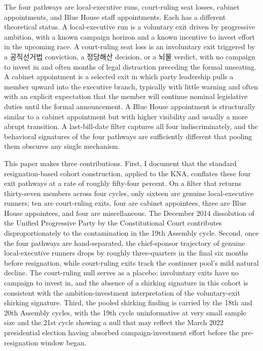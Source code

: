 \documentclass[11pt]{article}
\begin{document}
The four pathways are local-executive runs, court-ruling seat losses, cabinet appointments, and Blue House staff appointments. Each has a different theoretical status. A local-executive run is a voluntary exit driven by progressive ambition, with a known campaign horizon and a known incentive to invest effort in the upcoming race. A court-ruling seat loss is an involuntary exit triggered by a 공직선거법 conviction, a 정당해산 decision, or a 뇌물 verdict, with no campaign to invest in and often months of legal distraction preceding the formal unseating. A cabinet appointment is a selected exit in which party leadership pulls a member upward into the executive branch, typically with little warning and often with an explicit expectation that the member will continue nominal legislative duties until the formal announcement. A Blue House appointment is structurally similar to a cabinet appointment but with higher visibility and usually a more abrupt transition. A last-bill-date filter captures all four indiscriminately, and the behavioral signatures of the four pathways are sufficiently different that pooling them obscures any single mechanism.

This paper makes three contributions. First, I document that the standard resignation-based cohort construction, applied to the KNA, conflates these four exit pathways at a rate of roughly fifty-four percent. On a filter that returns thirty-seven members across four cycles, only sixteen are genuine local-executive runners; ten are court-ruling exits, four are cabinet appointees, three are Blue House appointees, and four are miscellaneous. The December 2014 dissolution of the Unified Progressive Party by the Constitutional Court contributes disproportionately to the contamination in the 19th Assembly cycle. Second, once the four pathways are hand-separated, the chief-sponsor trajectory of genuine local-executive runners drops by roughly three-quarters in the final six months before resignation, while court-ruling exits track the continuer pool's mild natural decline. The court-ruling null serves as a placebo: involuntary exits have no campaign to invest in, and the absence of a shirking signature in this cohort is consistent with the ambition-investment interpretation of the voluntary-exit shirking signature. Third, the pooled shirking finding is carried by the 18th and 20th Assembly cycles, with the 19th cycle uninformative at very small sample size and the 21st cycle showing a null that may reflect the March 2022 presidential election having absorbed campaign-investment effort before the pre-resignation window began.
\end{document}
